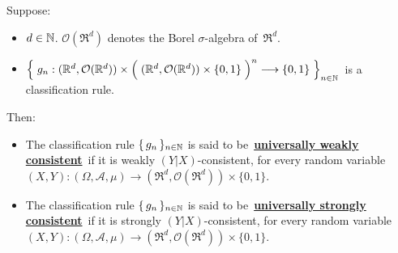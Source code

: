 \newpage
\begin{definition}
\mbox{}\vskip 0.1cm
\noindent
Suppose:
\begin{itemize}
\item
	$d \in \mathbb{N}$.
	$\mathcal{O}(\Re^{d})$ denotes the Borel $\sigma$-algebra of \,$\Re^{d}$.
\item
	$\left\{\;
		g_{n} :
		(\Re^{d},\mathcal{O}(\Re^{d})) \times \left(\;(\Re^{d},\mathcal{O}(\Re^{d})) \overset{{\color{white}.}}{\times} \{0,1\} \;\right)^{n}
		\longrightarrow
		\{0,1\}
	\;\right\}_{n\in\N}$
	\,is a classification rule.
\end{itemize}
Then:
\begin{itemize}
\item
	The classification rule $\{\,g_{n}\,\}_{n\in\mathbb{N}}$ is said to be
	\,\underline{\textbf{universally weakly consistent}}\, if
	it is weakly $(Y \vert X)$-consistent, for every random variable
	$(X,Y) : (\Omega,\mathcal{A},\mu) \longrightarrow (\Re^{d},\mathcal{O}(\Re^{d})) \times \{0,1\}$.
\item
	The classification rule $\{\,g_{n}\,\}_{n\in\mathbb{N}}$ is said to be
	\,\underline{\textbf{universally strongly consistent}}\, if
	it is strongly $(Y \vert X)$-consistent, for every random variable
	$(X,Y) : (\Omega,\mathcal{A},\mu) \longrightarrow (\Re^{d},\mathcal{O}(\Re^{d})) \times \{0,1\}$.
\end{itemize}
\end{definition}



\renewcommand{\theenumi}{\roman{enumi}}
\renewcommand{\labelenumi}{\textnormal{(\theenumi)}$\;\;$}

